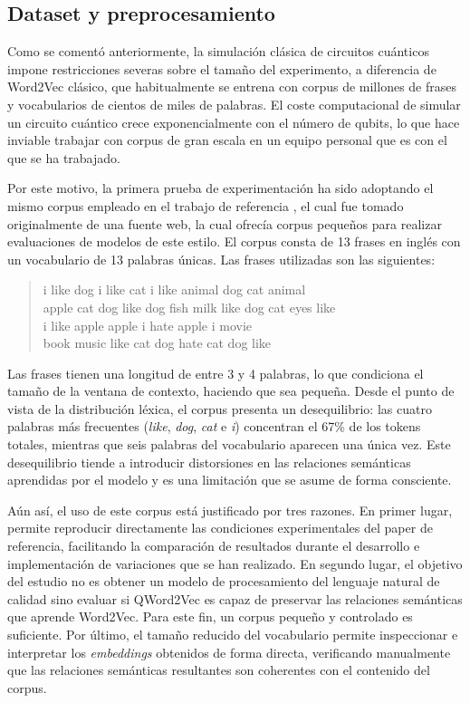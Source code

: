 \subsection{Dataset y preprocesamiento}

Como se comentó anteriormente, la simulación clásica de circuitos cuánticos impone restricciones severas sobre el tamaño del experimento, a diferencia de Word2Vec clásico, que habitualmente se entrena con corpus de millones de frases y vocabularios de cientos de miles de palabras. El coste computacional de simular un circuito cuántico crece exponencialmente con el número de qubits, lo que hace inviable trabajar con corpus de gran escala en un equipo personal que es con el que se ha trabajado.

Por este motivo, la primera prueba de experimentación ha sido adoptando el mismo corpus empleado en el trabajo de referencia \cite{ohno_qword2vec_2025}, el cual fue tomado originalmente de una fuente web, la cual ofrecía corpus pequeños para realizar evaluaciones de modelos de este estilo. El corpus consta de 13 frases en inglés con un vocabulario de 13 palabras únicas. Las frases utilizadas son las siguientes:

\begin{quote}
  \ttfamily
  i like dog \quad i like cat \quad i like animal \quad dog cat animal \\
  apple cat dog like \quad dog fish milk like \quad dog cat eyes like \\
  i like apple \quad apple i hate \quad apple i movie \\
  book music like \quad cat dog hate \quad cat dog like
\end{quote}

Las frases tienen una longitud de entre 3 y 4 palabras, lo que condiciona el tamaño de la ventana de contexto, haciendo que sea pequeña. Desde el punto de vista de la distribución léxica, el corpus presenta un desequilibrio: las cuatro palabras más frecuentes (\textit{like}, \textit{dog}, \textit{cat} e \textit{i}) concentran el 67\% de los tokens totales, mientras que seis palabras del vocabulario aparecen una única vez. Este desequilibrio tiende a introducir distorsiones en las relaciones semánticas aprendidas por el modelo y es una limitación que se asume de forma consciente.

Aún así, el uso de este corpus está justificado por tres razones. En primer lugar, permite reproducir directamente las condiciones experimentales del paper de referencia, facilitando la comparación de resultados durante el desarrollo e implementación de variaciones que se han realizado. En segundo lugar, el objetivo del estudio no es obtener un modelo de procesamiento del lenguaje natural de calidad sino evaluar si QWord2Vec es capaz de preservar las relaciones semánticas que aprende Word2Vec. Para este fin, un corpus pequeño y controlado es suficiente. Por último, el tamaño reducido del vocabulario permite inspeccionar e interpretar los \textit{embeddings} obtenidos de forma directa, verificando manualmente que las relaciones semánticas resultantes son coherentes con el contenido del corpus.

